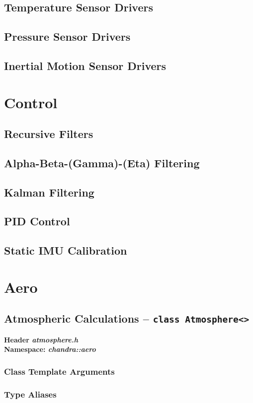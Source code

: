 \documentclass[10pt,letterpaper]{memoir} %
\newcommand{\apiheader}[2]{\noindent{}\textbf{Header \emph{#1}}\\\noindent{}\textbf{Namespace: \emph{#2}}}
\begin{document}
\section{Temperature Sensor Drivers}
\section{Pressure Sensor Drivers}
\section{Inertial Motion Sensor Drivers}

\chapter{Control}
\section{Recursive Filters}
\section{Alpha-Beta-(Gamma)-(Eta) Filtering}
\section{Kalman Filtering}
\section{PID Control}
\section{Static IMU Calibration}

\chapter{Aero}
\section{Atmospheric Calculations -- \texttt{class Atmosphere<>}}
\label{sec::atmosphere:calculation::api}
\apiheader{atmosphere.h}{chandra::aero}
\subsection{Class Template Arguments}
\subsection{Type Aliases}
\end{document}
